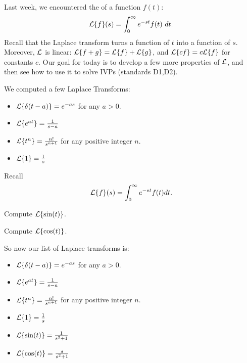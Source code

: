 \begin{applicationActivities}

\begin{observation}
Last week, we encountered the  of a function \(f(t)\):
\[\L\{f\}(s)=\int _0 ^\infty e^{-st}f(t)\ dt.\]
\vfill
Recall that the Laplace transform turns a function of \(t\) into a function of \(s\).
\vfill
Moreover, \(\mathcal{L}\) is linear: \(\mathcal{L}\{f+g\}=\mathcal{L}\{f\}+\mathcal{L}\{g\}\), and \(\mathcal{L}\{cf\}=c\mathcal{L}\{f\}\) for constants \(c\).
\vfill
Our goal for today is to develop a few more properties of \(\mathcal{L}\), and then see how to use it to solve IVPs (standards D1,D2).
\end{observation}

\begin{observation}
We computed a few Laplace Transforms:
\begin{itemize}
\item \(\mathcal{L}\{\delta(t-a)\} = e^{-as}\) for any \(a>0\).
\item \(\mathcal{L}\{e^{at}\} = \frac{1}{s-a}\) 
\item \(\mathcal{L}\{t^n\} = \frac{n!}{s^{n+1}}\) for any positive integer \(n\).
\item \(\mathcal{L}\{1\} = \frac{1}{s}\)
\end{itemize}
\end{observation}

\begin{activity}{10}
Recall \[\mathcal{L}\{f\}(s)=\int _0 ^\infty e^{-st}f(t)dt.\]
\begin{subactivity}
Compute \(\mathcal{L}\{\sin(t)\}\).
\end{subactivity}
\begin{subactivity}
Compute \(\mathcal{L}\{\cos(t)\}\).
\end{subactivity}
\end{activity}

\begin{observation}
So now our list of Laplace transforms is:
\begin{itemize}
\item \(\mathcal{L}\{\delta(t-a)\} = e^{-as}\) for any \(a>0\).
\item \(\mathcal{L}\{e^{at}\} = \frac{1}{s-a}\) 
\item \(\mathcal{L}\{t^n\} = \frac{n!}{s^{n+1}}\) for any positive integer \(n\).
\item \(\mathcal{L}\{1\} = \frac{1}{s}\)
\item \(\mathcal{L}\{\sin(t)\} = \frac{1}{s^2+1}\)
\item \(\mathcal{L}\{\cos(t)\} = \frac{s}{s^2+1}\)
\end{itemize}
\end{observation}


\end{applicationActivities}
